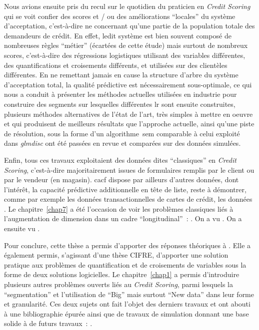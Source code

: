 Nous avions ensuite pris du recul sur le quotidien du praticien en \textit{Credit Scoring} qui se voit confier des scores et / ou des améliorations ``locales'' du système d'acceptation, c'est-à-dire ne concernant qu'une partie de la population totale des demandeurs de crédit. En effet, ledit système est bien souvent composé de nombreuses règles ``métier'' (écartées de cette étude) mais surtout de nombreux scores, c'est-à-dire des régressions logistiques utilisant des variables différentes, des quantifications et croisements différents, et utilisées sur des clientèles différentes. En ne remettant jamais en cause la structure d'arbre du système d'acceptation total, la qualité prédictive est nécessairement sous-optimale, ce qui nous a conduit à présenter les méthodes actuelles utilisées en industrie pour construire des segments sur lesquelles différentes \gls{lr} sont ensuite construites, plusieurs méthodes alternatives de l'état de l'art, très simples à mettre en oeuvre et qui produisent de meilleurs résultats que l'approche actuelle, ainsi qu'une piste de résolution, sous la forme d'un algorithme~\gls{sem} comparable à celui exploité dans \textit{glmdisc} ont été passées en revue et comparées sur des données simulées.

\medskip

Enfin, tous ces travaux exploitaient des données dites ``classiques'' en \textit{Credit Scoring}, c'est-à-dire majoritairement issues de formulaires remplis par le client ou par le vendeur (en magasin). \gls{cacf} dispose par ailleurs d'autres données, dont l'intérêt, la capacité prédictive additionnelle en tête de liste, reste à démontrer, comme par exemple les données transactionnelles de cartes de crédit, les données . Le chapitre~\ref{chap7} a été l'occasion de voir les problèmes classiques liés à l'augmentation de dimension dans un cadre ``longitudinal''~: . On a vu . On a ensuite vu .

\medskip

Pour conclure, cette thèse a permis d'apporter des réponses théoriques à . Elle a également permis, s'agissant d'une thèse CIFRE, d'apporter une solution pratique aux problèmes de quantification et de croisements de variables sous la forme de deux solutions logicielles. Le chapitre~\ref{chap1} a permis d'introduire plusieurs autres problèmes ouverts liés au \textit{Credit Scoring}, parmi lesquels la ``segmentation'' et l'utilisation de ``Big'' mais surtout ``New data'' dans leur forme et granularité. Ces deux sujets ont fait l'objet des derniers travaux et ont abouti à une bibliographie épurée ainsi que de travaux de simulation donnant une base solide à de futurs travaux~: . 